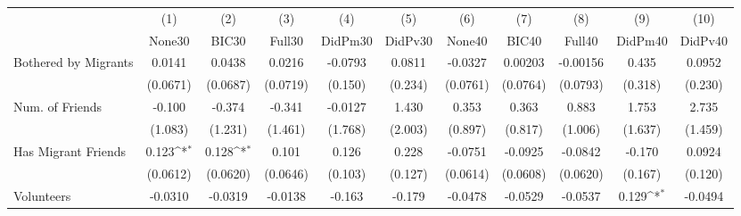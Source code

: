 {
\def\sym#1{\ifmmode^{#1}\else\(^{#1}\)\fi}
\begin{tabular}{l*{10}{c}}
\toprule
            &\multicolumn{1}{c}{(1)}&\multicolumn{1}{c}{(2)}&\multicolumn{1}{c}{(3)}&\multicolumn{1}{c}{(4)}&\multicolumn{1}{c}{(5)}&\multicolumn{1}{c}{(6)}&\multicolumn{1}{c}{(7)}&\multicolumn{1}{c}{(8)}&\multicolumn{1}{c}{(9)}&\multicolumn{1}{c}{(10)}\\
            &\multicolumn{1}{c}{None30}&\multicolumn{1}{c}{BIC30}&\multicolumn{1}{c}{Full30}&\multicolumn{1}{c}{DidPm30}&\multicolumn{1}{c}{DidPv30}&\multicolumn{1}{c}{None40}&\multicolumn{1}{c}{BIC40}&\multicolumn{1}{c}{Full40}&\multicolumn{1}{c}{DidPm40}&\multicolumn{1}{c}{DidPv40}\\
\midrule
Bothered by Migrants&      0.0141         &      0.0438         &      0.0216         &     -0.0793         &      0.0811         &     -0.0327         &     0.00203         &    -0.00156         &       0.435         &      0.0952         \\
            &    (0.0671)         &    (0.0687)         &    (0.0719)         &     (0.150)         &     (0.234)         &    (0.0761)         &    (0.0764)         &    (0.0793)         &     (0.318)         &     (0.230)         \\
\addlinespace
Num. of Friends&      -0.100         &      -0.374         &      -0.341         &     -0.0127         &       1.430         &       0.353         &       0.363         &       0.883         &       1.753         &       2.735         \\
            &     (1.083)         &     (1.231)         &     (1.461)         &     (1.768)         &     (2.003)         &     (0.897)         &     (0.817)         &     (1.006)         &     (1.637)         &     (1.459)         \\
\addlinespace
Has Migrant Friends&       0.123\sym{*}  &       0.128\sym{*}  &       0.101         &       0.126         &       0.228         &     -0.0751         &     -0.0925         &     -0.0842         &      -0.170         &      0.0924         \\
            &    (0.0612)         &    (0.0620)         &    (0.0646)         &     (0.103)         &     (0.127)         &    (0.0614)         &    (0.0608)         &    (0.0620)         &     (0.167)         &     (0.120)         \\
\addlinespace
Volunteers  &     -0.0310         &     -0.0319         &     -0.0138         &      -0.163         &      -0.179         &     -0.0478         &     -0.0529         &     -0.0537         &       0.129\sym{*}  &     -0.0494         \\

\end{tabular}}
